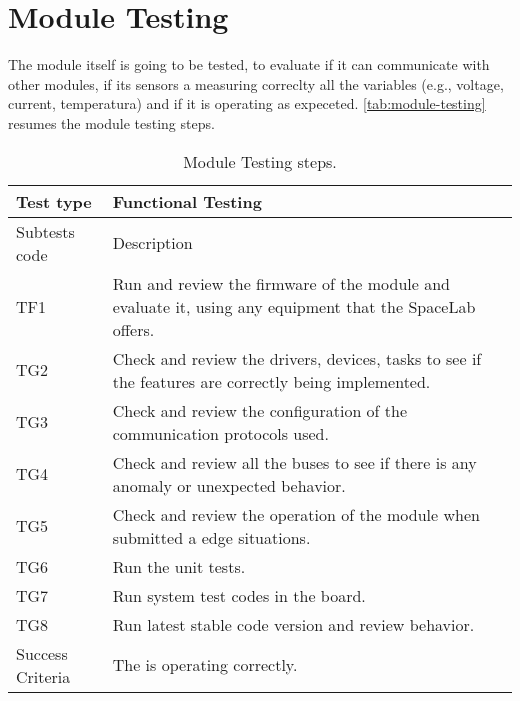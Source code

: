 \section {Module Testing}

The module itself is going to be tested, to evaluate if it can communicate with other modules, if its sensors a measuring correclty all the variables (e.g., voltage, current, temperatura) and if it is operating as expeceted. \autoref{tab:module-testing} resumes the module testing steps.

\begin{table}[!htb]
\centering
\caption{Module Testing steps.}
\label{tab:module-testing}
\begin{tabular}{m{3cm} m{12cm} m{3cm}}
\toprule
Test type & Functional Testing \\
\midrule
\midrule
Subtests code & Description \\ 
\midrule
TF1 & Run and review the firmware of the module and evaluate it, using any equipment that the SpaceLab offers. \\
\midrule
TG2 & Check and review the drivers, devices, tasks to see if the features are correctly being implemented. \\
\midrule
TG3 & Check and review the configuration of the communication protocols used. \\
\midrule
TG4 & Check and review all the buses to see if there is any anomaly or unexpected behavior. \\
\midrule
TG5 & Check and review the operation of the module when submitted a edge situations. \\
\midrule
TG6 & Run the unit tests. \\
\midrule
TG7 & Run system test codes in the board. \\
\midrule
TG8 & Run latest stable code version and review behavior. \\
\midrule
\midrule
Success Criteria & The is operating correctly. \\
\bottomrule
\end{tabular}
\end{table}
